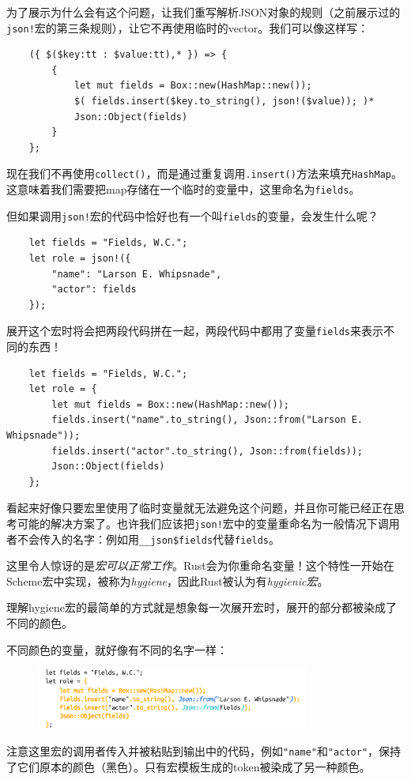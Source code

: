 为了展示为什么会有这个问题，让我们重写解析JSON对象的规则（之前展示过的\texttt{json!}宏的第三条规则），让它不再使用临时的vector。我们可以像这样写：
\begin{verbatim}
    ({ $($key:tt : $value:tt),* }) => {
        {
            let mut fields = Box::new(HashMap::new());
            $( fields.insert($key.to_string(), json!($value)); )*
            Json::Object(fields)
        }
    };
\end{verbatim}

现在我们不再使用\texttt{collect()}，而是通过重复调用\texttt{.insert()}方法来填充\texttt{HashMap}。这意味着我们需要把map存储在一个临时的变量中，这里命名为\texttt{fields}。

但如果调用\texttt{json!}宏的代码中恰好也有一个叫\texttt{fields}的变量，会发生什么呢？
\begin{verbatim}
    let fields = "Fields, W.C.";
    let role = json!({
        "name": "Larson E. Whipsnade",
        "actor": fields
    });
\end{verbatim}

展开这个宏时将会把两段代码拼在一起，两段代码中都用了变量\texttt{fields}来表示不同的东西！
\begin{verbatim}
    let fields = "Fields, W.C.";
    let role = {
        let mut fields = Box::new(HashMap::new());
        fields.insert("name".to_string(), Json::from("Larson E. Whipsnade"));
        fields.insert("actor".to_string(), Json::from(fields));
        Json::Object(fields)
    };
\end{verbatim}

看起来好像只要宏里使用了临时变量就无法避免这个问题，并且你可能已经正在思考可能的解决方案了。也许我们应该把\texttt{json!}宏中的变量重命名为一般情况下调用者不会传入的名字：例如用\texttt{\_\_json\$fields}代替\texttt{fields}。

这里令人惊讶的是\emph{宏可以正常工作}。Rust会为你重命名变量！这个特性一开始在Scheme宏中实现，被称为\emph{hygiene}，因此Rust被认为有\emph{hygienic宏}。

理解hygiene宏的最简单的方式就是想象每一次展开宏时，展开的部分都被染成了不同的颜色。

不同颜色的变量，就好像有不同的名字一样：
\begin{figure}[h]
    \centering
    \includegraphics[width=0.8\textwidth]{../img/f21-x.png}
\end{figure}
注意这里宏的调用者传入并被粘贴到输出中的代码，例如\texttt{"name"}和\texttt{"actor"}，保持了它们原本的颜色（黑色）。只有宏模板生成的token被染成了另一种颜色。

